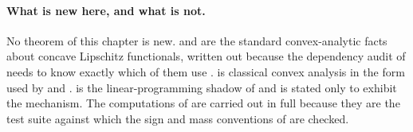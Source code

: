 \paragraph{What is new here, and what is not.}
No theorem of this chapter is new.
 and
 are the standard convex-analytic
facts about concave Lipschitz functionals, written out because the
dependency audit of  needs to know exactly
which of them use .
 is classical convex analysis in the
form used by \cite{BGPS14} and \cite{BGJKK25}.
 is the linear-programming shadow of
 and is stated only to
exhibit the mechanism.  The computations of  are
carried out in full because they are the test suite against which the sign
and mass conventions of  are checked.
